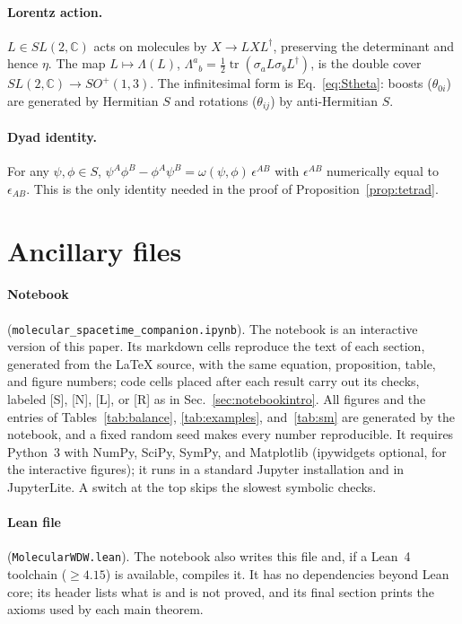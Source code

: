 \documentclass[reprint,aps,prd,amsmath,amssymb,superscriptaddress,nofootinbib,floatfix]{revtex4-2}
\theoremstyle{plain}
\theoremstyle{definition}
\theoremstyle{remark}
\newcommand{\Mol}{\ensuremath{X}}                 %
\newcommand{\tr}{\operatorname{tr}}
\newcommand{\SLC}{SL(2,\mathbb{C})}
\begin{document}
\paragraph*{Lorentz action.} $L\in\SLC$ acts on molecules by $\Mol\to L\Mol L^\dagger$, preserving the
determinant and hence $\eta$. The map $L\mapsto\Lambda(L)$, $\Lambda^a{}_b=\tfrac12\tr(\sigma_aL\sigma_bL^\dagger)$, is
the double cover $\SLC\to SO^+(1,3)$. The infinitesimal form is Eq.~\eqref{eq:Stheta}: boosts
($\theta_{0i}$) are generated by Hermitian $S$ and rotations ($\theta_{ij}$) by anti-Hermitian $S$.

\paragraph*{Dyad identity.} For any $\psi,\phi\in S$,
$\psi^A\phi^B-\phi^A\psi^B=\omega(\psi,\phi)\,\epsilon^{AB}$ with $\epsilon^{AB}$ numerically equal to
$\epsilon_{AB}$. This is the only identity needed in the proof of Proposition~\ref{prop:tetrad}.

\section{Ancillary files}
\label{app:files}

\paragraph*{Notebook} (\texttt{molecular\_spacetime\_}\allowbreak\texttt{companion.ipynb}). The notebook is an interactive
version of this paper. Its markdown cells reproduce the text of each section, generated from the \LaTeX{}
source, with the same equation, proposition, table, and figure numbers; code cells placed after each result
carry out its checks, labeled [S], [N], [L], or [R] as in Sec.~\ref{sec:notebookintro}. All figures and the entries of
Tables~\ref{tab:balance}, \ref{tab:examples}, and~\ref{tab:sm} are generated by the notebook, and a fixed random seed makes every number
reproducible. It requires Python~3 with NumPy, SciPy, SymPy, and Matplotlib (ipywidgets optional, for the
interactive figures); it runs in a standard Jupyter installation and in JupyterLite. A switch at the top skips
the slowest symbolic checks.

\paragraph*{Lean file} (\texttt{MolecularWDW.lean}). The notebook also writes this file and, if a Lean~4 toolchain
($\geq4.15$) is available, compiles it. It has no dependencies beyond Lean core; its header lists what is and is
not proved, and its final section prints the axioms used by each main theorem.
\end{document}
